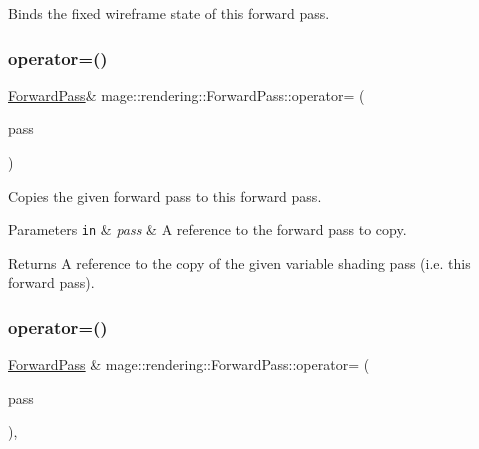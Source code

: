 Binds the fixed wireframe state of this forward pass. \hypertarget{classmage_1_1rendering_1_1_forward_pass_a373b424f52fb5a209bed756dc06f47ee}{}\label{classmage_1_1rendering_1_1_forward_pass_a373b424f52fb5a209bed756dc06f47ee} 
\subsubsection{\texorpdfstring{operator=()}{operator=()}\hspace{0.1cm}{\footnotesize\ttfamily [1/2]}}
{\footnotesize\ttfamily \hyperlink{classmage_1_1rendering_1_1_forward_pass}{Forward\+Pass}\& mage\+::rendering\+::\+Forward\+Pass\+::operator= (\begin{DoxyParamCaption}\item[{const \hyperlink{classmage_1_1rendering_1_1_forward_pass}{Forward\+Pass} \&}]{pass }\end{DoxyParamCaption})\hspace{0.3cm}{\ttfamily [delete]}}

Copies the given forward pass to this forward pass.


\begin{DoxyParams}[1]{Parameters}
\mbox{\tt in}  & {\em pass} & A reference to the forward pass to copy. \\
\hline
\end{DoxyParams}
\begin{DoxyReturn}{Returns}
A reference to the copy of the given variable shading pass (i.\+e. this forward pass). 
\end{DoxyReturn}
\hypertarget{classmage_1_1rendering_1_1_forward_pass_aba2191f3e482d2fb0db2ad2cab77c817}{}\label{classmage_1_1rendering_1_1_forward_pass_aba2191f3e482d2fb0db2ad2cab77c817} 
\subsubsection{\texorpdfstring{operator=()}{operator=()}\hspace{0.1cm}{\footnotesize\ttfamily [2/2]}}
{\footnotesize\ttfamily \hyperlink{classmage_1_1rendering_1_1_forward_pass}{Forward\+Pass} \& mage\+::rendering\+::\+Forward\+Pass\+::operator= (\begin{DoxyParamCaption}\item[{\hyperlink{classmage_1_1rendering_1_1_forward_pass}{Forward\+Pass} \&\&}]{pass }\end{DoxyParamCaption})\hspace{0.3cm}{\ttfamily [default]}, {\ttfamily [noexcept]}}

